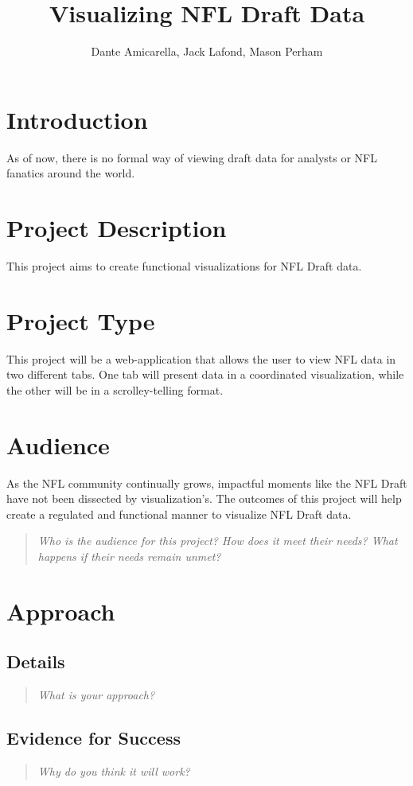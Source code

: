 \documentclass{proc}
\begin{document}
\title{Visualizing NFL Draft Data}

\author{Dante Amicarella, Jack Lafond, Mason Perham}

\maketitle

\section{Introduction}
As of now, there is no formal way of viewing draft data for analysts or NFL fanatics around the world.
\section{Project Description}
This project aims to create functional visualizations for NFL Draft data. 
\section{Project Type}
This project will be a web-application that allows the user to view NFL data in two different tabs. One tab will present data in a coordinated visualization, while the other will be in a scrolley-telling format. 
\section{Audience} 
As the NFL community continually grows, impactful moments like the NFL Draft have not been dissected by visualization's. The outcomes of this project will help create a regulated and functional manner to visualize NFL Draft data. 
\begin{quote}
\textit{Who is the audience for this project? 
How does it meet their needs? 
What happens if their needs remain unmet?}
\end{quote}

\section{Approach}
\subsection{Details}
\begin{quote}
\textit{What is your approach?}

\end{quote}

\subsection{Evidence for Success}
\begin{quote}
\textit{Why do you think it will work?} 
\end{quote}
\end{document}
